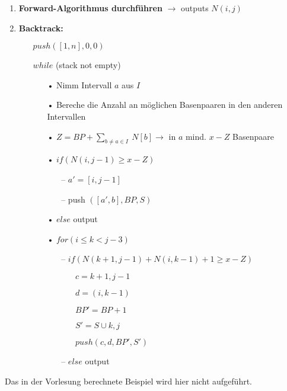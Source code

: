 \begin{enumerate}
\item\textbf{Forward-Algorithmus durchführen} $\rightarrow$ outputs $N(i,j)$
\item\textbf{Backtrack:}
	\begin{itemize}
		\item[]$push ([1,n], 0, 0)$
		\item[]$while$ (stack not empty)
		\begin{itemize}
			\item[•]Nimm Intervall $a$ aus $I$
			\item[•]Bereche die Anzahl an möglichen Basenpaaren in den anderen Intervallen
			\item[•]$Z=BP + \displaystyle\sum_{b\neq a \in I}\ N[b] \rightarrow$ in $a$ mind. $x-Z$ Basenpaare
			\item[•]$ if (N(i, j-1)\ge x-Z)$
			\begin{itemize}
				\item[--]$a' = [i, j-1]$
				\item[--]push $([a',b],BP,S)$
			\end{itemize}
			\item[•]$else$ output
			\item[•]$for (i\le k < j-3)$
			\begin{itemize}
				\item[--]$if (N(k+1,j-1)+N(i,k-1)+1\ge x-Z)$
				\begin{itemize}
				\item[]$c=k+1, j-1$
				\item[]$d=(i, k-1)$
				\item[]$BP'=BP+1$
				\item[]$S'=S\cup {k,j}$
				\item[]$push (c,d,BP',S')$
				\end{itemize}
				\item[--]$else$ output
			\end{itemize}
		\end{itemize}
	\end{itemize}
\end{enumerate}
Das in der Vorlesung berechnete Beispiel wird hier nicht aufgeführt.